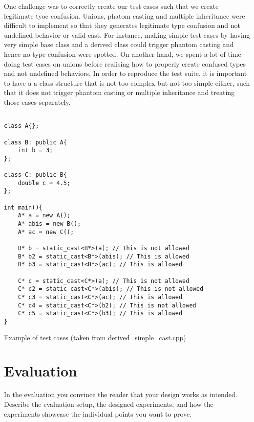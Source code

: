 \documentclass[a4paper,11pt,oneside]{report}
\begin{document}
\noindent{}One challenge was to correctly create our test cases such that we create legitimate tyoe confusion.
Unions, phatom casting and multiple inheritance were difficult to implement so that they generates legitimate type confusion 
and not undefined behavior or valid cast. For instance, making simple test cases by having very simple base class and a derived class 
could trigger phantom casting and hence no type confusion were spotted. On another hand, we spent a lot of time doing test cases on unions 
before realising how to properly create confused types and not undefined behaviors. 
In order to reproduce the test suite, it is important to have a a class structure that is not too complex but not too simple either, 
such that it does not trigger phantom casting or multiple inheritance and treating those cases separately.

\begin{listing}
       \begin{verbatim}

class A{};

class B: public A{
    int b = 3;
};

class C: public B{
    double c = 4.5;
}; 

int main(){
    A* a = new A();
    A* abis = new B();
    A* ac = new C();

    B* b = static_cast<B*>(a); // This is not allowed
    B* b2 = static_cast<B*>(abis); // This is allowed
    B* b3 = static_cast<B*>(ac); // This is allowed

    C* c = static_cast<C*>(a); // This is not allowed
    C* c2 = static_cast<C*>(abis); // This is not allowed
    C* c3 = static_cast<C*>(ac); // This is allowed
    C* c4 = static_cast<C*>(b2); // This is not allowed
    C* c5 = static_cast<C*>(b3); // This is allowed
}
       \end{verbatim}
       \caption{Example of test cases (taken from derived\_simple\_cast.cpp)}
       \label{lst:test_cases}
\end{listing}

\chapter{Evaluation}

In the evaluation you convince the reader that your design works as intended.
Describe the evaluation setup, the designed experiments, and how the
experiments showcase the individual points you want to prove.
\end{document}
